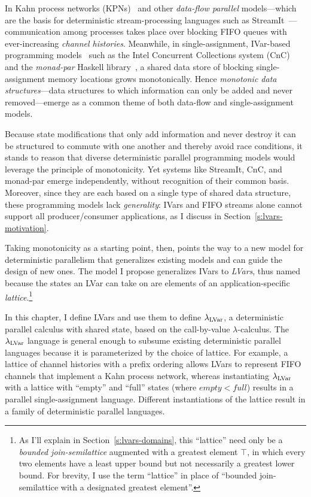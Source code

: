 In Kahn process networks (KPNs)~\cite{Kahn-1974} and other
\emph{data-flow parallel} models---which are the basis for
deterministic stream-processing languages such as
StreamIt~\cite{streamit-asplos}---communication among processes takes
place over blocking FIFO queues with ever-increasing \emph{channel
  histories}.  Meanwhile, in single-assignment, IVar-based programming
models~\cite{Tesler-1968, IStructures} such as the Intel Concurrent
Collections system (CnC)~\cite{CnC} and the \emph{monad-par} Haskell
library~\cite{monad-par}, a shared data store of blocking
single-assignment memory locations grows monotonically.  Hence
\emph{monotonic data structures}---data structures to which
information can only be added and never removed---emerge as a common
theme of both data-flow and single-assignment models.

Because state modifications that only add information and never
destroy it can be structured to commute with one another and thereby
avoid race conditions, it stands to reason that diverse deterministic
parallel programming models would leverage the principle of
monotonicity.  Yet systems like StreamIt, CnC, and monad-par emerge
independently, without recognition of their common basis.  Moreover,
since they are each based on a single type of shared data structure,
these programming models lack \emph{generality}: IVars and FIFO
streams alone cannot support all producer/consumer applications, as I
discuss in Section~\ref{s:lvars-motivation}.

Taking monotonicity as a starting point, then, points the way to a new
model for deterministic parallelism that generalizes existing models
and can guide the design of new ones.  The model I propose generalizes
IVars to \emph{LVars}, thus named because the states an LVar can take
on are elements of an application-specific {\em lattice}.\footnote{As
  I'll explain in Section~\ref{s:lvars-domains}, this ``lattice'' need
  only be a {\em bounded join-semilattice} augmented with a greatest
  element $\top$, in which every two elements have a least upper bound
  but not necessarily a greatest lower bound.  For brevity, I use the
  term ``lattice'' in place of ``bounded join-semilattice with a
  designated greatest element''.}

In this chapter, I define LVars and use them to define $\lambda_{\textrm{LVar}}$,
a deterministic parallel calculus with shared state, based on the
call-by-value $\lambda$-calculus.  The $\lambda_{\textrm{LVar}}$ language is
general enough to subsume existing deterministic parallel languages
because it is parameterized by the choice of lattice.  For example, a
lattice of channel histories with a prefix ordering allows LVars to
represent FIFO channels that implement a Kahn process network, whereas
instantiating $\lambda_{\textrm{LVar}}$ with a lattice with ``empty'' and ``full''
states (where $\mathit{empty} < \mathit{full}$) results in a parallel
single-assignment language.  Different instantiations of the lattice
result in a family of deterministic parallel languages.

